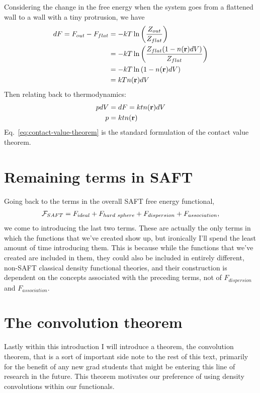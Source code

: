 Considering the change in the free energy when the system goes from a
flattened wall to a wall with a tiny protrusion, we have
\begin{align}
  dF = F_{out} - F_{flat} &= -kT \ln \left( \frac{Z_{out}}{Z_{flat}} \right) \notag \\
  &= -kT \ln \left( \frac{Z_{flat} (1-n(\textbf{r})dV)}{Z_{flat}} \right) \notag \\
  &= -kT \ln \left( 1-n(\textbf{r})dV \right) \notag \\
  &= kTn(\textbf{r})dV
\end{align}
Then relating back to thermodynamics:
\begin{align}
  pdV &= dF = ktn(\textbf{r})dV \\
  \label{eq:contact-value-theorem}
  p &= ktn(\textbf{r})
\end{align}
Eq.~\ref{eq:contact-value-theorem} is the standard formulation of the
contact value theorem.



\clearpage
\newpage

\section{Remaining terms in SAFT}
Going back to the terms in the overall SAFT free energy functional,
\begin{align}
  \mathcal{F}_{SAFT} = F_{ideal} + F_{hard~sphere} +  F_{dispersion} + F_{association},
\end{align}
we come to introducing the last two terms.  These are actually the
only terms in which the functions that we've created show up, but
ironically I'll spend the least amount of time introducing them.  This
is because while the functions that we've created are included in
them, they could also be included in entirely different, non-SAFT
classical density functional theories, and their construction is
dependent on the concepts associated with the preceding terms, not of
$F_{dispersion}$ and $F_{association}$.


\clearpage
\newpage

\section{The convolution theorem}

Lastly within this introduction I will introduce a theorem, the
convolution theorem, that is a sort of important side note to the rest
of this text, primarily for the benefit of any new grad students that
might be entering this line of research in the future.  This theorem
motivates our preference of using density convolutions within our
functionals.


